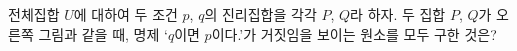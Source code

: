 \noindent\begin{minipage}[t]{0.58\linewidth}\vspace{0pt}\raggedright 전체집합 $U$에 대하여 두 조건 $p$, $q$의 진리집합을 각각 $P$, $Q$라 하자. 두 집합 $P$, $Q$가 오른쪽 그림과 같을 때, 명제 ‘$q$이면 $p$이다.’가 거짓임을 보이는 원소를 모두 구한 것은?\end{minipage}\hfill\begin{minipage}[t]{0.4\linewidth}\vspace{0pt}\centering \resizebox{\ifdim\width>\linewidth\linewidth\else\width\fi}{!}{}\end{minipage}\par
{}
